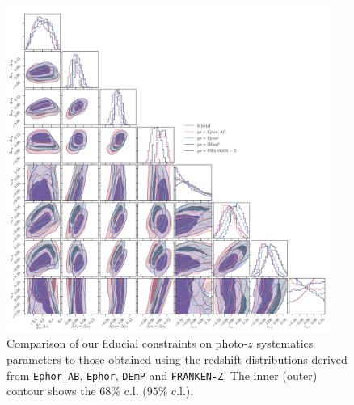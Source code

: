 \documentclass[a4paper,11pt]{article}
\begin{document}
\begin{figure}
\begin{center}
\includegraphics[width=0.95\textwidth]{figures/contours-pz-syst_mPk=HOD_fix=alpha-fc-sigmaM_HOD=zevol_fit=pz-shifts-pz-widths+prior=0p2_fit=auto+cross_cosmo=const_HOD-param=zfid_clfit=HOD-zevol_pz-methods.pdf}
\caption{Comparison of our fiducial constraints on photo-$z$ systematics parameters to those obtained using the redshift distributions derived from \texttt{Ephor\_AB}, \texttt{Ephor}, \texttt{DEmP} and \texttt{FRANKEN-Z}. The inner (outer) contour shows the $68 \%$ c.l. ($95 \%$ c.l.).}
\label{fig:constraints-pz-syst-fit-pz-shifts+pz-widths-pz-methods}
\end{center}
\end{figure}
 
\end{document}
